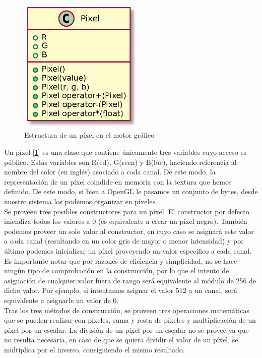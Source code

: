 %
%
%

\begin{figure}[h]
	\centering
	\includegraphics[width=6cm]{archivos/pixeluml}
	\caption{Estructura de un píxel en el motor gráfico}
	\label{fig:pixeluml}
\end{figure}

Un píxel [\ref{fig:pixeluml}] es una clase que contiene únicamente tres variables cuyo acceso es público. Estas variables son R(ed), G(reen) y B(lue), haciendo referencia al nombre del color (en inglés) asociado a cada canal. De este modo, la representación de un píxel coindide en memoria con la textura que hemos definido. De este modo, si bien a OpenGL le pasamos un conjunto de bytes, desde nuestro sistema los podemos organizar en píxeles.\\

Se proveen tres posibles constructores para un píxel. El constructor por defecto inicializa todos los valores a 0 (es equivalente a crear un píxel negro). También podemos proveer un solo valor al constructor, en cuyo caso se asignará este valor a cada canal (resultando en un color gris de mayor o menor intensidad) y por último podemos inicializar un píxel proveyendo un valor específico a cada canal. Es importante notar que por razones de eficiencia y simplicidad, no se hace ningún tipo de comprobación en la construcción, por lo que el intento de asignación de cualquier valor fuera de rango será equivalente al módulo de 256 de dicho valor. Por ejemplo, si intentamos asignar el valor 512 a un canal, será equivalente a asignarle un valor de 0.\\

Tras los tres métodos de construcción, se proveen tres operaciones matemáticas que se pueden realizar con píxeles, suma y resta de píxeles y multiplicación de un píxel por un escalar. La división de un píxel por un escalar no se provee ya que no resulta necesaria, en caso de que se quiera dividir el valor de un píxel, se multiplica por el inverso, consiguiendo el mismo resultado.\\

